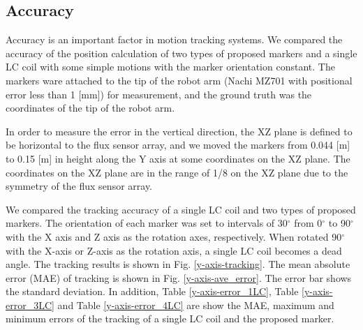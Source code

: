 \documentclass[journal,twoside,web]{ieeecolor}
\begin{document}
\subsection{Accuracy}
Accuracy is an important factor in motion tracking systems. We compared the accuracy of the position calculation of two types of proposed markers and a single LC coil with some simple motions with the marker orientation constant. The markers ware attached to the tip of the robot arm (Nachi MZ701 with positional error less than 1 [mm]) for measurement, and the ground truth was the coordinates of the tip of the robot arm.

In order to measure the error in the vertical direction, the XZ plane is defined to be horizontal to the flux sensor array, and we moved the markers from 0.044 [m] to 0.15 [m] in height along the Y axis at some coordinates on the XZ plane. The coordinates on the XZ plane are in the range of 1/8 on the XZ plane due to the symmetry of the flux sensor array.

We compared the tracking accuracy of a single LC coil and two types of proposed markers. The orientation of each marker was set to intervals of 30$^\circ$ from 0$^\circ$ to 90$^\circ$ with the X axis and Z axis as the rotation axes, respectively. When rotated 90$^\circ$ with the X-axis or Z-axis as the rotation axis, a single LC coil becomes a dead angle. The tracking results is shown in Fig. \ref{y-axis-tracking}. The mean absolute error (MAE) of tracking is shown in Fig. \ref{y-axis-ave_error}. The error bar shows the standard deviation. In addition, Table \ref{y-axis-error_1LC}, Table \ref{y-axis-error_3LC} and Table \ref{y-axis-error_4LC} are show the MAE, maximum and minimum errors of the tracking of a single LC coil and the proposed marker.
\end{document}
